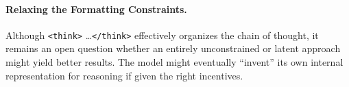 \paragraph{Relaxing the Formatting Constraints.}

Although \texttt{<think>} \ldots \texttt{</think>} effectively organizes the chain of thought, it remains an open question whether an entirely unconstrained or latent approach might yield better results. The model might eventually ``invent'' its own internal representation for reasoning if given the right incentives.

